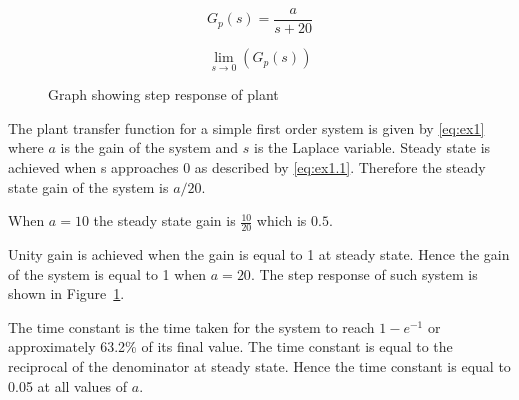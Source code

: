 \renewcommand{\ex}{ex1} 

\begin{equation}
    G_{p}\left(s\right)=\frac{a}{s+20}
    \label{eq:\ex}
\end{equation}

\begin{equation}
    \lim_{s\to0}\left(G_{p}\left(s\right)\right)
    \label{eq:\ex.1}
\end{equation}

\begin{figure}[ht!]
    \centering
    
    \caption{Graph showing step response of plant }
    \label{fig:\ex}
\end{figure}\FloatBarrier

The plant transfer function for a simple first order system is given by \eqref{eq:\ex} where $a$ is the gain of the system and $s$ is the Laplace variable. Steady state is achieved when s approaches 0 as described by \eqref{eq:\ex.1}. Therefore the steady state gain of the system is $a/20$.

When $a=10$ the steady state gain is $\frac{10}{20}$ which is $0.5$.

Unity gain is achieved when the gain is equal to 1 at steady state. Hence the gain of the system is equal to 1 when $a=20$. The step response of such system is shown in Figure~\ref{fig:\ex}.

The time constant is the time taken for the system to reach $1-e^{-1}$ or approximately 63.2\% of its final value. The time constant is equal to the reciprocal of the denominator at steady state. Hence the time constant is equal to 0.05 at all values of $a$.




